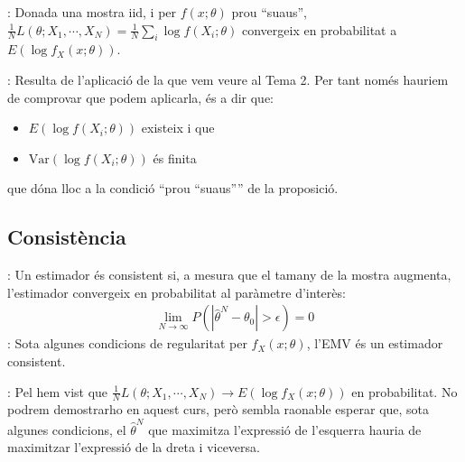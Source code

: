 \documentclass[letterpaper,10pt,english]{sphinxmanual}
\begin{document}
: Donada una mostra iid, i per \(f(x; \theta)\) prou “suaus”,
\(\frac{1}{N}L(\theta; X_1, \cdots, X_N) = \frac{1}{N}\sum_i \log f(X_i; \theta)\)
convergeix en probabilitat a \(E(\log f_X(x; \theta))\).

: Resulta de l’aplicació de la 
que vem veure al Tema 2. Per tant només hauriem de comprovar que podem aplicar\sphinxhyphen{}la, és a dir que:
\begin{itemize}
\item {} 
\(E(\log f(X_i; \theta))\) existeix i que

\item {} 
\(\mbox{Var}(\log f(X_i; \theta))\) és finita

\end{itemize}

que dóna lloc a la condició “prou “suaus”” de la proposició.


\subsection{Consistència}
\label{\detokenize{0_Intro/0_3_Estimacio:consistencia}}
: Un estimador és consistent si, a mesura
que el tamany de la mostra augmenta, l’estimador
convergeix en probabilitat al paràmetre d’interès:
\begin{equation*}
\begin{split}\lim_{N\to \infty} P(|\hat{\theta}^N - \theta_0|>\epsilon) = 0\end{split}
\end{equation*}
: Sota algunes condicions de regularitat per \(f_X(x; \theta)\),
l’EMV és un estimador consistent.

: Pel  hem vist que
\(\frac{1}{N}L(\theta; X_1, \cdots, X_N)  \to E(\log f_X(x; \theta))\)
en probabilitat. No podrem demostrar\sphinxhyphen{}ho en aquest curs,
però sembla raonable esperar que, sota algunes condicions,
el \(\hat{\theta}^N\) que maximitza l’expressió de l’esquerra
hauria de maximitzar l’expressió de la dreta i viceversa.
\end{document}
